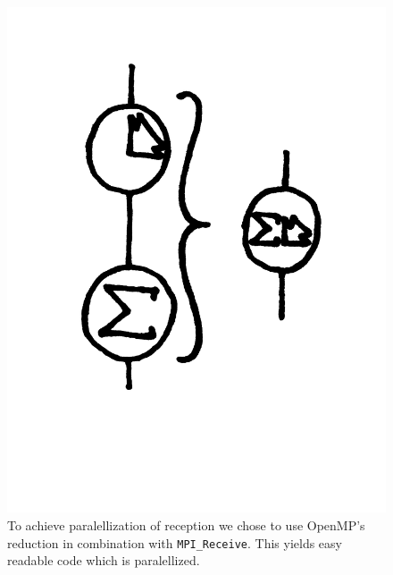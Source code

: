 \begin{figure}
\includegraphics[width=\textwidth]{flyt2}
\caption{To achieve paralellization of reception we chose to use OpenMP's reduction in combination with {\tt MPI\_Receive}. This yields easy readable code which is paralellized. }
\end{figure}
